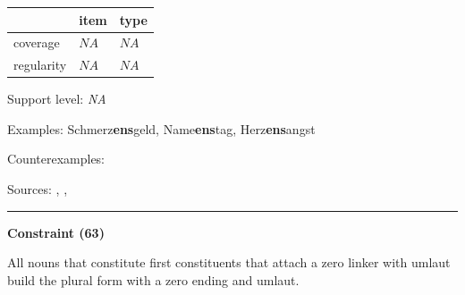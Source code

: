 \vspace{-0.25em}

\begin{table}[!ht]
\begin{center}
\setlength{\extrarowheight}{1pt}
\begin{tabularx}{\columnwidth}{|X|X|X|}
\hline
 & item & type \\
\hline
 coverage & $NA$ & $NA$ \\
\hline
 regularity & $NA$ & $NA$ \\
\hline
\end{tabularx}
\end{center}
\end{table}

\vspace{-1.35em}

\noindent
Support level: \textit{NA}

\vspace{0.3em}

\noindent
Examples: Schmerz\textbf{ens}geld, Name\textbf{ens}tag, Herz\textbf{ens}angst

\noindent
Counterexamples: 

\vspace{0.3em}

\noindent
Sources: \citet[82]{nuebling_szczepaniak_2013}, \citet[80, 97]{ortner_mueller-bollhagen_1991}, \citet[9]{schaefer_pankratz_2018}

\vspace{0.35em}
\hrule




\vspace{0.4em}

\begin{center}
\textbf{Constraint (63)}
\end{center}

\noindent
All nouns that constitute first constituents that attach a zero linker with umlaut build the plural form with a zero ending and umlaut.
\vspace{0.5em}



